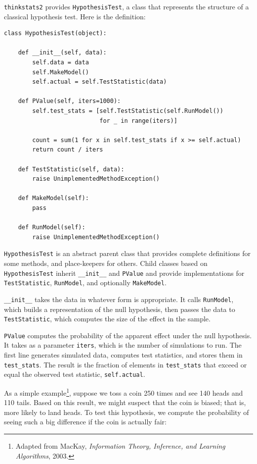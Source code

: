 \documentclass[12pt]{book}
\begin{document}
{\tt thinkstats2} provides {\tt HypothesisTest}, a
class that represents the structure of a classical hypothesis
test.  Here is the definition:

\begin{verbatim}
class HypothesisTest(object):

    def __init__(self, data):
        self.data = data
        self.MakeModel()
        self.actual = self.TestStatistic(data)

    def PValue(self, iters=1000):
        self.test_stats = [self.TestStatistic(self.RunModel()) 
                           for _ in range(iters)]

        count = sum(1 for x in self.test_stats if x >= self.actual)
        return count / iters

    def TestStatistic(self, data):
        raise UnimplementedMethodException()

    def MakeModel(self):
        pass

    def RunModel(self):
        raise UnimplementedMethodException()
\end{verbatim}

{\tt HypothesisTest} is an abstract parent class that provides
complete definitions for some methods, and place-keepers for others.
Child classes based on {\tt HypothesisTest} inherit \verb"__init__"
and {\tt PValue} and provide implementations for {\tt TestStatistic},
{\tt RunModel}, and optionally {\tt MakeModel}.

\verb"__init__" takes the data in whatever form is appropriate.  It
calls {\tt RunModel}, which builds a representation of the null
hypothesis, then passes the data to {\tt TestStatistic}, which
computes the size of the effect in the sample.

{\tt PValue} computes the probability of the apparent effect under
the null hypothesis.  It takes as a parameter {\tt iters}, which is
the number of simulations to run.  The first line generates simulated
data, computes test statistics, and stores them in
\verb"test_stats".
The result is
the fraction of elements in \verb"test_stats" that
exceed or equal the observed test statistic, {\tt self.actual}.

As a simple example\footnote{Adapted from MacKay, {\it Information
    Theory, Inference, and Learning Algorithms}, 2003.}, suppose we
toss a coin 250 times and see 140 heads and 110 tails.  Based on this
result, we might suspect that the coin is biased; that is, more likely
to land heads.  To test this hypothesis, we compute the
probability of seeing such a big difference if the coin is actually
fair:
\end{document}
